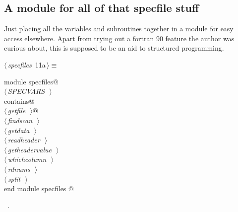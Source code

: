 \documentclass[10pt,a4paper,notitlepage]{article}
\begin{document}
\subsection{A module for all of that specfile stuff}
Just placing all the variables and subroutines together in a module for easy
access elsewhere. Apart from trying out a fortran 90 feature the author was 
curious about, this is supposed to be an aid to structured programming.

\begin{flushleft} \small
\begin{minipage}{\linewidth}\label{scrap12}\raggedright\small
{} $\langle\,${\it specfiles}\nobreak\ {\footnotesize {11a}}$\,\rangle\equiv$
\vspace{-1ex}
\begin{list}{}{} \item
\mbox{}\verb@      module specfiles@\\
\mbox{}\verb@@\hbox{$\langle\,${\it SPECVARS}\nobreak\ {\footnotesize {}}$\,\rangle$}\verb@@\\
\mbox{}\verb@      contains@\\
\mbox{}\verb@@\hbox{$\langle\,${\it getfile}\nobreak\ {\footnotesize {}}$\,\rangle$}\verb@ @\\
\mbox{}\verb@@\hbox{$\langle\,${\it findscan}\nobreak\ {\footnotesize {}}$\,\rangle$}\verb@@\\
\mbox{}\verb@@\hbox{$\langle\,${\it getdata}\nobreak\ {\footnotesize {}}$\,\rangle$}\verb@@\\
\mbox{}\verb@@\hbox{$\langle\,${\it readheader}\nobreak\ {\footnotesize {}}$\,\rangle$}\verb@@\\
\mbox{}\verb@@\hbox{$\langle\,${\it getheadervalue}\nobreak\ {\footnotesize {}}$\,\rangle$}\verb@@\\
\mbox{}\verb@@\hbox{$\langle\,${\it whichcolumn}\nobreak\ {\footnotesize {}}$\,\rangle$}\verb@@\\
\mbox{}\verb@@\hbox{$\langle\,${\it rdnums}\nobreak\ {\footnotesize {}}$\,\rangle$}\verb@@\\
\mbox{}\verb@@\hbox{$\langle\,${\it split}\nobreak\ {\footnotesize {}}$\,\rangle$}\verb@@\\
\mbox{}\verb@      end module specfiles                                                   @{\NWsep}
\end{list}
\vspace{-1.5ex}
\footnotesize
\begin{list}{}{\setlength{\itemsep}{-\parsep}\setlength{\itemindent}{-\leftmargin}}
\item \NWtxtMacroRefIn\ .


\end{list}
\end{minipage}
\end{flushleft}
\end{document}
